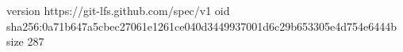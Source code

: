 version https://git-lfs.github.com/spec/v1
oid sha256:0a71b647a5cbec27061e1261ce040d3449937001d6c29b653305e4d754e6444b
size 287
